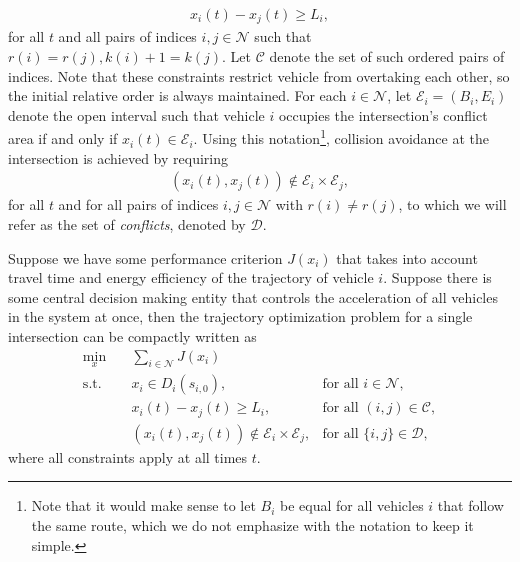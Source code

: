 \documentclass[a4paper]{article}
\theoremstyle{definition}
\theoremstyle{plain}
\begin{document}
\begin{align}
  \label{eq:follow_constraints}
  x_{i}(t) - x_{j}(t) \geq L_{i} ,
\end{align}
for all $t$ and all pairs of indices $i, j \in \mathcal{N}$ such that
$r(i) = r(j), k(i) + 1 = k(j)$. Let $\mathcal{C}$ denote the set of such ordered
pairs of indices. Note that these constraints restrict vehicle from overtaking
each other, so the initial relative order is always maintained.
%
For each $i \in \mathcal{N}$, let $\mathcal{E}_{i} = (B_{i}, E_{i})$ denote the
open interval such that vehicle $i$ occupies the intersection's conflict area if
and only if $x_{i}(t) \in \mathcal{E}_{i}$. Using this notation\footnote{Note
  that it would make sense to let $B_{i}$ be equal for all vehicles $i$ that
  follow the same route, which we do not emphasize with the notation to keep it
  simple.}, collision avoidance at the intersection is achieved by requiring
\begin{align}
  \label{eq:conflict_constraints}
  (x_{i}(t), x_{j}(t)) \notin \mathcal{E}_{i} \times \mathcal{E}_{j} ,
\end{align}
for all $t$ and for all pairs of indices $i, j \in \mathcal{N}$ with
$r(i) \neq r(j)$, to which we will refer as the set of \textit{conflicts}, denoted
by $\mathcal{D}$.

Suppose we have some performance criterion $J(x_{i})$ that takes into account
travel time and energy efficiency of the trajectory of vehicle $i$. Suppose
there is some central decision making entity that controls the acceleration of
all vehicles in the system at once, then the trajectory optimization problem for
a single intersection can be compactly written as
\begin{subequations}
\label{eq:offline_single_intersection}
\begin{align}
  \min_{x} \quad & \sum_{i \in \mathcal{N}} J(x_{i}) \\
  \text{s.t.} \quad  & x_{i} \in D_{i}(s_{i,0}) , &\text{for all } i \in \mathcal{N} , \\
                & x_{i}(t) - x_{j}(t) \geq L_{i}, &\text{for all } (i,j) \in \mathcal{C} , \\
                & (x_{i}(t), x_{j}(t))  \notin \mathcal{E}_{i} \times \mathcal{E}_{j} , &\text{for all } \{i,j\} \in \mathcal{D} \label{eq:collision_constraints} ,
\end{align}
\end{subequations}
where all constraints apply at all times $t$.
\end{document}
